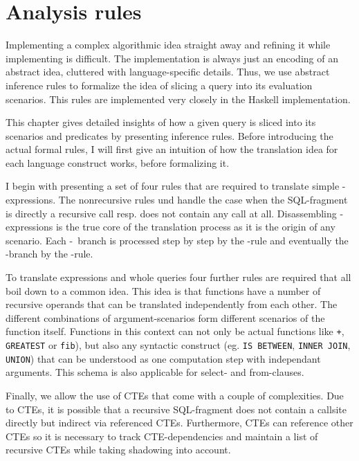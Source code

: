 \chapter{Analysis rules}\label{chapter:analysis}



Implementing a complex algorithmic idea straight away and refining it while implementing is difficult. The implementation is always just an encoding of an abstract idea, cluttered with language-specific details. Thus, we use abstract inference rules to formalize the idea of slicing a query into its evaluation scenarios. This rules are implemented very closely in the Haskell implementation.

This chapter gives detailed insights of how a given query is sliced into its scenarios and predicates by presenting inference rules. Before introducing the actual formal rules, I will first give an intuition of how the translation idea for each language construct works, before formalizing it.

I begin with presenting a set of four rules that are required to translate simple \CASE-expressions. The nonrecursive rules \RREC und \RBASE handle the case when the SQL-fragment is directly a recursive call resp. does not contain any call at all. Disassembling \CASE-expressions is the true core of the translation process as it is the origin of any scenario. Each \WHEN-\THEN~branch is processed step by step by the \RWHEN-rule and eventually the \ELSE-branch by the \RELSE-rule.

To translate expressions and whole queries four further rules are required that all boil down to a common idea. This idea is that functions have a number of recursive operands that can be translated independently from each other. The different combinations of argument-scenarios form different scenarios of the function itself. Functions in this context can not only be actual functions like \texttt{+}, \texttt{GREATEST} or \texttt{fib}), but also any syntactic construct (eg. \texttt{IS BETWEEN}, \texttt{INNER JOIN}, \texttt{UNION}) that can be understood as one computation step with independant arguments. This schema is also applicable for select- and from-clauses.

Finally, we allow the use of CTEs that come with a couple of complexities. Due to CTEs, it is possible that a recursive SQL-fragment does not contain a callsite directly but indirect via referenced CTEs. Furthermore, CTEs can reference other CTEs so it is necessary to track CTE-dependencies and maintain a list of recursive CTEs while taking shadowing into account.

